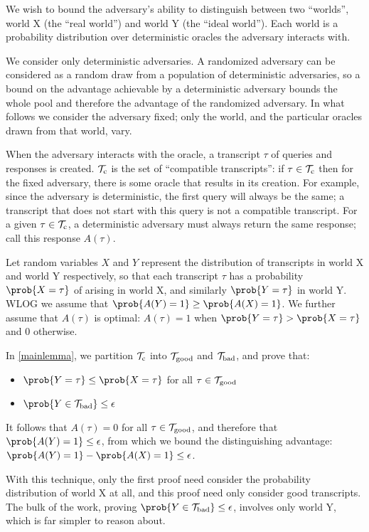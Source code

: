\documentclass[hctr.tex]{subfiles}
\begin{document}
We wish to bound the adversary's ability to distinguish between
two ``worlds'', world X (the ``real world'') and world Y (the ``ideal world'').
Each world is a probability distribution over
deterministic oracles the adversary interacts with.

We consider only deterministic adversaries.
A randomized adversary can be considered as a random draw
from a population of deterministic adversaries, so
a bound on the advantage achievable by a deterministic
adversary bounds the whole pool and therefore
the advantage of the randomized adversary. In what follows
we consider the adversary fixed; only the world, and the
particular oracles drawn from that world, vary.

When the adversary interacts with the oracle,
a transcript \(\tau\) of queries and responses is created.
\(\mathcal{T}_\mathrm{c}\) is the set of ``compatible transcripts'':
if \(\tau \in \mathcal{T}_\mathrm{c}\) then for the fixed adversary,
there is some oracle
that results in its creation. For example,
since the adversary is deterministic, the first query
will always be the same; a transcript that
does not start with this query is not a compatible transcript.
For a given \(\tau \in \mathcal{T}_\mathrm{c}\),
a deterministic adversary must always
return the same response; call this response \(A(\tau)\).

Let random variables \(X\) and \(Y\)
represent the distribution of transcripts
in world X and world Y respectively, so that
each transcript \(\tau\) has a probability \(\prob{X = \tau}\)
of arising in world X, and similarly \(\prob{Y = \tau}\) in world Y.
WLOG we assume that \(\prob{A(Y) = 1} \geq \prob{A(X) = 1}\).
We further assume that \(A(\tau)\) is optimal:
\(A(\tau) = 1\)
when \(\prob{Y = \tau} > \prob{X = \tau}\) and 0 otherwise.

In \autoref{mainlemma}, we partition \(\mathcal{T}_\mathrm{c}\) into \(\mathcal{T}_\mathrm{good}\) and \(\mathcal{T}_\mathrm{bad}\),
and prove that:
\begin{itemize}
    \item \(\prob{Y = \tau} \leq \prob{X = \tau}\) for all \(\tau \in \mathcal{T}_\mathrm{good}\)
    \item \(\prob{Y \in \Tb} \leq \epsilon\)
\end{itemize}
It follows that \(A(\tau) = 0\) for all \(\tau \in \mathcal{T}_\mathrm{good}\),
and therefore that \(\prob{A(Y) = 1} \leq \epsilon\),
from which we bound the distinguishing advantage:
\(\prob{A(Y) = 1} - \prob{A(X) = 1} \leq \epsilon\).

With this technique, only the first proof
need consider the probability
distribution of world X at all,
and this proof need only consider good transcripts.
The bulk of the work, proving
\(\prob{Y \in \Tb} \leq \epsilon\),
involves only world Y, which is far simpler
to reason about.
\end{document}
